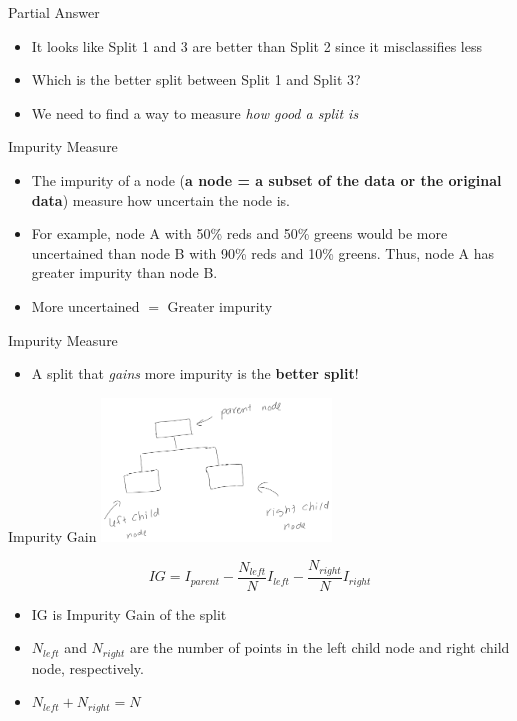 \documentclass[
  ignorenonframetext,
]{beamer}
\providecommand{\tightlist}{%
  \setlength{\itemsep}{0pt}\setlength{\parskip}{0pt}}\usepackage{longtable,booktabs,array}
\begin{document}
\begin{frame}{Partial Answer}
\label{partial-answer}
\begin{itemize}
\tightlist
\item
  It looks like Split 1 and 3 are better than Split 2 since it
  misclassifies less
\item
  Which is the better split between Split 1 and Split 3?
\item
  We need to find a way to measure \emph{how good a split is}
\end{itemize}
\end{frame}

\begin{frame}{Impurity Measure}
\label{impurity-measure}
\begin{itemize}
\tightlist
\item
  The impurity of a node (\textbf{a node = a subset of the data or the
  original data}) measure how uncertain the node is.\\
\item
  For example, node A with 50\% reds and 50\% greens would be more
  uncertained than node B with 90\% reds and 10\% greens. Thus, node A
  has greater impurity than node B.
\item
  More uncertained \(=\) Greater impurity
\end{itemize}
\end{frame}

\begin{frame}{Impurity Measure}
\label{impurity-measure-1}
\begin{itemize}
\tightlist
\item
  A split that \emph{gains} more impurity is the \textbf{better split}!
\end{itemize}
\end{frame}

\begin{frame}{Impurity Gain}
\label{impurity-gain}
\includegraphics[width=\textwidth,height=1.5in]{images/parent_child.png}

\[
IG = I_{parent} - \frac{N_{left}}{N}I_{left}-\frac{N_{right}}{N}I_{right}
\]

\begin{itemize}
\tightlist
\item
  IG is Impurity Gain of the split
\item
  \(N_{left}\) and \(N_{right}\) are the number of points in the left
  child node and right child node, respectively.
\item
  \(N_{left}+N_{right}=N\)
\end{itemize}
\end{frame}
\end{document}
